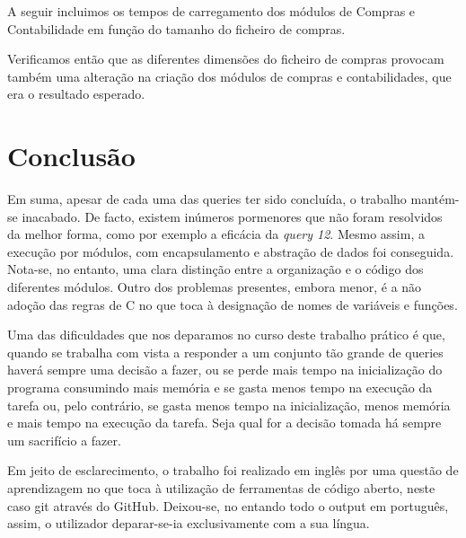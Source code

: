 \documentclass[10pt] {article}
\begin{document}
\par A seguir incluimos os tempos de carregamento dos módulos de Compras e Contabilidade em função do 
tamanho do ficheiro de compras.
\par Verificamos então que as diferentes dimensões do ficheiro de compras provocam também uma alteração na 
criação dos módulos de compras e contabilidades, que era o resultado esperado.

\newpage
\section{Conclusão}

\indent\par Em suma, apesar de cada uma das queries ter sido concluída, o trabalho mantém-se inacabado. De
facto, existem inúmeros pormenores que não foram resolvidos da melhor forma, como por exemplo a
eficácia da \emph{query 12}. Mesmo assim, a execução por módulos, com encapsulamento e abstração de dados
foi conseguida. Nota-se, no entanto, uma clara distinção entre a organização e o código dos diferentes módulos.
Outro dos problemas presentes, embora menor, é a não adoção das regras de C no que toca à designação de
nomes de variáveis e funções.
\par Uma das dificuldades que nos deparamos no curso deste trabalho prático é que, quando se trabalha com vista a responder a um conjunto tão grande de queries
haverá sempre uma decisão a fazer, ou se perde mais tempo na inicialização do programa consumindo mais memória e se gasta
menos tempo na execução da tarefa ou, pelo contrário, se gasta menos tempo na inicialização, menos memória e mais tempo na
execução da tarefa. Seja qual for a decisão tomada há sempre um sacrifício a fazer.
\par Em jeito de esclarecimento, o trabalho foi realizado em inglês por uma questão de aprendizagem no que toca à
utilização de ferramentas de código aberto, neste caso git através do GitHub. Deixou-se, no entando todo o output em português, assim, o utilizador
deparar-se-ia exclusivamente com a sua língua.
\end{document}

